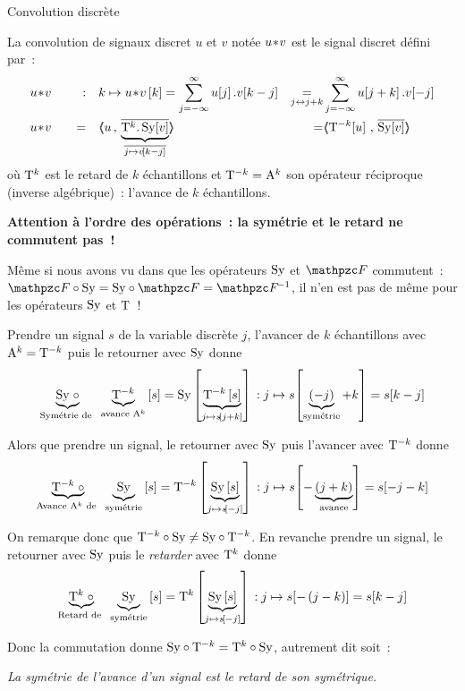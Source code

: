 \begin{definition}{Convolution discrète}
  \label{def:convolution_discrete}
  
  La convolution de signaux discret $u$ et $v$ notée $u\!\ast\! v$ est le
  signal discret défini par~:
  \begin{align}
    \label{eq:convolution_discrete}
    &u\conv v \quad &:& \quad k \mapsto u\conv v\b{k} =\somme{j=-\infty}{\infty}{u\ded{j}.v\ded{k-j}} &\underset{j\leftrightarrow j+k}{=}&  \somme{j=-\infty}{\infty}{u\ded{j+k}.v\ded{-j}} \nonumber\\
    &u\conv v \quad & = &\quad\scald{u}{\caCest{\conj{\oret^k.\,\Sy\ded{v}}}{\conj{j\mapsto v\ded{k-j}}}} &=& \scald{\oret^{-k}\ded{u}}{\conj{\Sy\ded{v}}} 
  \end{align}
  où $\mathrm{T}^k$ est le retard de $k$ échantillons et
  $\mathrm{T}^{-k}=\mathrm{A}^k$ son opérateur réciproque (inverse
  algébrique)~: l'avance de $k$ échantillons.
\end{definition}

\begin{remarque}
  \textbf{Attention à l'ordre des opérations~: la symétrie et le
    retard ne commutent pas~!}

  Même si nous avons vu dans  que les opérateurs
  $\mathrm{Sy}$ et $\F$ commutent~: $\F\circ\Sy=\Sy\circ\F=\Finv$, il n'en est
  pas de même pour les opérateurs $\mathrm{Sy}$ et $\mathrm{T}$~!

  Prendre un signal $s$ de la variable discrète $j$, l'avancer de $k$
  échantillons avec $\mathrm{A}^k=\mathrm{T}^{-k}$ puis le retourner avec
  $\mathrm{Sy}$ donne
  $$\underbrace{\mathrm{Sy}\;\circ}_{\text{Symétrie de }}\;\underbrace{\mathrm{T}^{-k}}_{\text{avance }\mathrm{A}^k}\left[s\right] = \mathrm{Sy}\left[\underbrace{\mathrm{T}^{-k}\left[s\right]}_{j\mapsto s\!\left[j+k\right]}\right]\,: j\mapsto s\!\left[\underbrace{\left(-j\right)}_{\text{symétrie}}+k\right]=s\!\left[k-j\right]$$

  Alors que prendre un signal, le retourner avec $\mathrm{Sy}$ puis l'avancer
  avec $\mathrm{T}^{-k}$ donne
  $$\underbrace{\mathrm{T}^{-k}\;\circ}_{\text{Avance }\mathrm{A}^k\text{ de }}\;\underbrace{\mathrm{Sy}}_{\text{symétrie}}\left[s\right]= \mathrm{T}^{-k}\left[\underbrace{\mathrm{Sy}\left[s\right]}_{j\mapsto s\!\left[-j\right]}\right]\,: j\mapsto s
  \!\left[-\underbrace{\left(j+k\right)}_{\text{avance}}\right]=s\!\left[-j-k\right]$$

  On remarque donc que $\mathrm{T}^{-k}\circ\mathrm{Sy}\neq\mathrm{Sy}\circ\mathrm{T}^{-k}$. En
  revanche prendre un signal, le retourner avec $\mathrm{Sy}$ puis le \emph{retarder}
  avec $\mathrm{T}^{k}$ donne
  $$\underbrace{\mathrm{T}^{k}\;\circ}_{\text{Retard de }}\;\underbrace{\mathrm{Sy}}_{\text{symétrie}}\left[s\right]= \mathrm{T}^{k}\left[\underbrace{\mathrm{Sy}\left[s\right]}_{j\mapsto s\!\left[-j\right]}\right]\,: j\mapsto s\!\left[-\left(j-k\right)\right]=s\!\left[k-j\right]$$

  Donc la commutation donne $\mathrm{Sy}\circ\mathrm{T}^{-k}=\mathrm{T}^{k}\circ\mathrm{Sy}$,
  autrement dit soit~:

\emph{  \og{} La symétrie de l'avance d'un signal est le retard de son
  symétrique\fg.}
\end{remarque}


